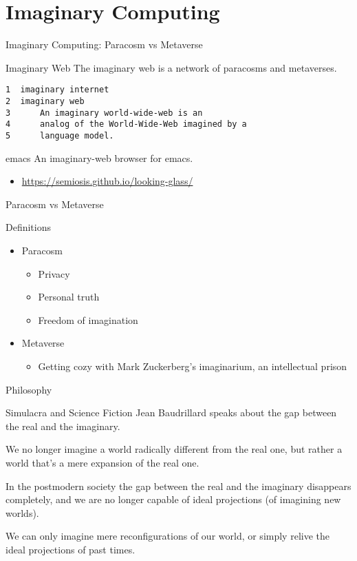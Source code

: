 \documentclass[presentation]{beamer}
\begin{document}
\section{Imaginary Computing}
\label{sec:org8c004d6}
\begin{frame}[label={sec:org2910e21},fragile]{Imaginary Computing: Paracosm vs Metaverse}
 \begin{block}{Imaginary Web}
The imaginary web is a network of paracosms
and metaverses.

\begin{verbatim}
1  imaginary internet
2  imaginary web
3      An imaginary world-wide-web is an
4      analog of the World-Wide-Web imagined by a
5      language model.
\end{verbatim}
\end{block}

\begin{block}{emacs}
An imaginary-web browser for emacs.

\begin{itemize}
\item \url{https://semiosis.github.io/looking-glass/}
\end{itemize}
\end{block}
\end{frame}

\begin{frame}[label={sec:org9910ada}]{Paracosm vs Metaverse}
\begin{block}{Definitions}
\begin{itemize}
\item Paracosm
\begin{itemize}
\item Privacy
\item Personal truth
\item Freedom of imagination
\end{itemize}
\item Metaverse
\begin{itemize}
\item Getting cozy with Mark Zuckerberg's imaginarium, an intellectual prison
\end{itemize}
\end{itemize}
\end{block}
\end{frame}

\begin{frame}[label={sec:org3d8dddd}]{Philosophy}
\begin{block}{Simulacra and Science Fiction}
Jean Baudrillard speaks about the gap
between the real and the imaginary.

We no longer imagine a world radically
different from the real one, but
rather a world that's a mere expansion
of the real one.

In the postmodern society the gap
between the real and the imaginary
disappears completely, and we are no
longer capable of ideal projections
(of imagining new worlds).

We can only imagine mere
reconfigurations of our world, or
simply relive the ideal projections of
past times.
\end{block}
\end{frame}
\end{document}
